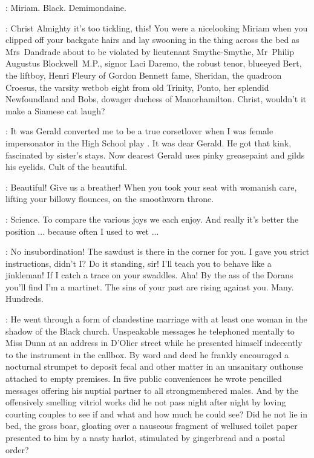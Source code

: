\Bloom:
Miriam.
Black.
Demimondaine.

\Bello:
Christ Almighty it's too tickling, this!
You were a nicelooking Miriam when you clipped off your backgate hairs
and lay swooning in the thing across the bed as Mrs~Dandrade
about to be violated by lieutenant Smythe-Smythe, Mr~Philip Augustus Blockwell~M.P.,
signor Laci Daremo, the robust tenor, blueeyed Bert, the liftboy,
Henri Fleury of Gordon Bennett fame, Sheridan, the quadroon Croesus,
the varsity wetbob eight from old Trinity, Ponto, her splendid Newfoundland
and Bobs, dowager duchess of Manorhamilton.
Christ, wouldn't it make a Siamese cat laugh?

\Bloom:
It was Gerald converted me to be a true corsetlover
when I was female impersonator in the High School play .
It was dear Gerald.
He got that kink, fascinated by sister's stays.
Now dearest Gerald uses pinky greasepaint and gilds his eyelids.
Cult of the beautiful.

\Bello:
Beautiful!
Give us a breather!
When you took your seat with womanish care,
lifting your billowy flounces, on the smoothworn throne.

\Bloom:
Science.
To compare the various joys we each enjoy.
And really it's better the position ...
because often I used to wet ...

\Bello:
No insubordination!
The sawdust is there in the corner for you.
I gave you strict instructions, didn't I?
Do it standing, sir!
I'll teach you to behave like a jinkleman!
If I catch a trace on your swaddles.
Aha!
By the ass of the Dorans you'll find I'm a martinet.
The sins of your past are rising against you.
Many. Hundreds.

\SinsPast:
He went through a form of clandestine marriage
with at least one woman in the shadow of the Black church.
Unspeakable messages he telephoned mentally to Miss Dunn
at an address in D'Olier street
while he presented himself indecently to the instrument in the callbox.
By word and deed he frankly encouraged a nocturnal strumpet
to deposit fecal and other matter
in an unsanitary outhouse attached to empty premises.
In five public conveniences he wrote pencilled messages
offering his nuptial partner to all strongmembered males.
And by the offensively smelling vitriol works
did he not pass night after night
by loving courting couples
to see if and what and how much he could see?
Did he not lie in bed, the gross boar,
gloating over a nauseous fragment of wellused toilet paper
presented to him by a nasty harlot,
stimulated by gingerbread and a postal order?%

